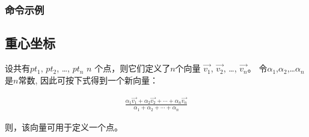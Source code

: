 \documentclass[../main.tex]{subfiles}
\begin{document}
\subsubsection{命令示例}


\begin{tkzexample}[latex=6cm,small]
\end{tkzexample}

\subsection{重心坐标}

设共有$pt_1$, $pt_2$, \dots, $pt_n$  $n$ 个点，则它们定义了$n$个向量
$\overrightarrow{v_1}$, $\overrightarrow{v_2}$, \dots, $\overrightarrow{v_n}$。
令$\alpha_1$,$\alpha_2$,\dots $\alpha_n$是$n$常数, 因此可按下式得到一个新向量：

\begin{align*}
  \frac{\alpha_1 \overrightarrow{v_1} + \alpha_2 \overrightarrow{v_2} + \cdots +
  \alpha_n \overrightarrow{v_n}}{\alpha_1
  + \alpha_2 + \cdots + \alpha_n}
\end{align*}

则，该向量可用于定义一个点。
\end{document}
